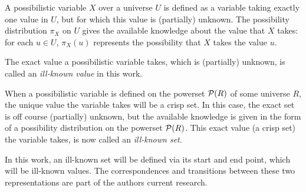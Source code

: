 \begin{definition}
A possibilistic variable $X$ over a universe $U$ is defined as a variable taking exactly one value in $U$, but for which this value is (partially) unknown. The possibility distribution $\pi_X$ on $U$ gives the available knowledge about the value that $X$ takes: for each $u\in U$, $\pi_X(u)$ represents the possibility that $X$ takes the value $u$.
\end{definition}

The exact value a possibilistic variable takes, which is (partially) unknown, is called an \emph{ill-known value} in this work\cite{Dubois88b}.

When a possibilistic variable is defined on the powerset $\mathcal{P}(R)$ of some universe $R$, the unique value the variable takes will be a crisp set. In this case, the exact set is off course (partially) unknown, but the available knowledge is given in the form of a possibility distribution on the powerset $\mathcal{P}(R)$. This exact value (a crisp set) the variable takes, is now called an \emph{ill-known set}\cite{Dubois88b}.

In this work, an ill-known set will be defined via its start and end point, which will be ill-known values. The correspondences and transitions between these two representations are part of the authors current research.




